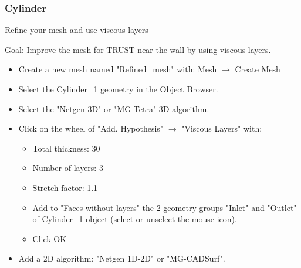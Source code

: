 \documentclass[10pt, hyperref={unicode=true,pdfusetitle, bookmarks=true,bookmarksnumbered=false,bookmarksopen=false, breaklinks=false,pdfborder={0 0l 1},backref=true,colorlinks=true,linkcolor=darkblue,pageanchor}]{beamer}
\begin{document}
\begin{frame}
\frametitle{Cylinder}
\begin{block}{Refine your mesh and use viscous layers}

Goal: Improve the mesh for TRUST near the wall by using viscous layers.

\begin{itemize}
\item Create a new mesh named "Refined\_mesh" with: Mesh $\rightarrow$ Create Mesh

\item Select the Cylinder\_1 geometry in the Object Browser.

\item Select the "Netgen 3D" or "MG-Tetra" 3D algorithm.

\item Click on the wheel of "Add. Hypothesis" $\rightarrow$ "Viscous Layers" with:
    \begin{itemize}
    \item [$\circ$] Total thickness: 30
    \item [$\circ$] Number of layers: 3
    \item [$\circ$] Stretch factor: 1.1
    \item [$\circ$] Add to "Faces without layers" the 2 geometry groups "Inlet" and "Outlet" of Cylinder\_1 object (select or unselect the mouse icon).
    \item [$\circ$] Click OK
    \end{itemize}

\item Add a 2D algorithm: "Netgen 1D-2D" or "MG-CADSurf".
\end{itemize}

\end{block}
\end{frame}
\end{document}
